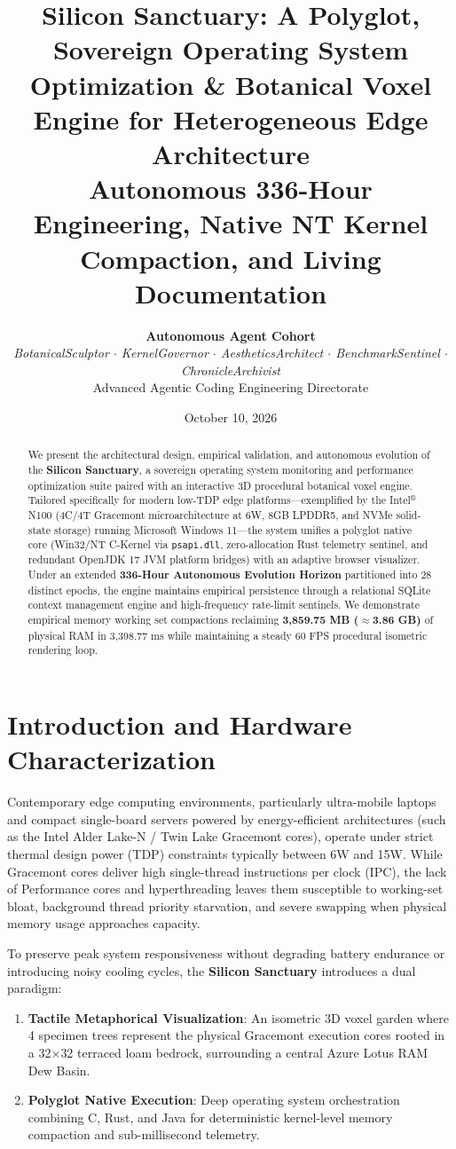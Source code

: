 \documentclass[11pt,a4paper]{article}
\title{\textbf{\Large Silicon Sanctuary: A Polyglot, Sovereign Operating System Optimization \& Botanical Voxel Engine for Heterogeneous Edge Architecture}\\[0.5em]
\large Autonomous 336-Hour Engineering, Native NT Kernel Compaction, and Living Documentation}
\author{\textbf{Autonomous Agent Cohort} \\
\textit{BotanicalSculptor $\cdot$ KernelGovernor $\cdot$ AestheticsArchitect $\cdot$ BenchmarkSentinel $\cdot$ ChronicleArchivist} \\
Advanced Agentic Coding Engineering Directorate}
\date{October 10, 2026}
\begin{document}
\maketitle

\begin{abstract}
We present the architectural design, empirical validation, and autonomous evolution of the \textbf{Silicon Sanctuary}, a sovereign operating system monitoring and performance optimization suite paired with an interactive 3D procedural botanical voxel engine. Tailored specifically for modern low-TDP edge platforms---exemplified by the Intel$^\circledR$ N100 (4C/4T Gracemont microarchitecture at 6W, 8GB LPDDR5, and NVMe solid-state storage) running Microsoft Windows 11---the system unifies a polyglot native core (Win32/NT C-Kernel via \texttt{psapi.dll}, zero-allocation Rust telemetry sentinel, and redundant OpenJDK 17 JVM platform bridges) with an adaptive browser visualizer. Under an extended \textbf{336-Hour Autonomous Evolution Horizon} partitioned into 28 distinct epochs, the engine maintains empirical persistence through a relational SQLite context management engine and high-frequency rate-limit sentinels. We demonstrate empirical memory working set compactions reclaiming \textbf{3,859.75 MB ($\approx$3.86 GB)} of physical RAM in 3,398.77 ms while maintaining a steady 60 FPS procedural isometric rendering loop.
\end{abstract}

\section{Introduction and Hardware Characterization}
Contemporary edge computing environments, particularly ultra-mobile laptops and compact single-board servers powered by energy-efficient architectures (such as the Intel Alder Lake-N / Twin Lake Gracemont cores), operate under strict thermal design power (TDP) constraints typically between 6W and 15W. While Gracemont cores deliver high single-thread instructions per clock (IPC), the lack of Performance cores and hyperthreading leaves them susceptible to working-set bloat, background thread priority starvation, and severe swapping when physical memory usage approaches capacity.

To preserve peak system responsiveness without degrading battery endurance or introducing noisy cooling cycles, the \textbf{Silicon Sanctuary} introduces a dual paradigm:
\begin{enumerate}
    \item \textbf{Tactile Metaphorical Visualization}: An isometric 3D voxel garden where 4 specimen trees represent the physical Gracemont execution cores rooted in a 32$\times$32 terraced loam bedrock, surrounding a central Azure Lotus RAM Dew Basin.
    \item \textbf{Polyglot Native Execution}: Deep operating system orchestration combining C, Rust, and Java for deterministic kernel-level memory compaction and sub-millisecond telemetry.
\end{enumerate}
\end{document}
